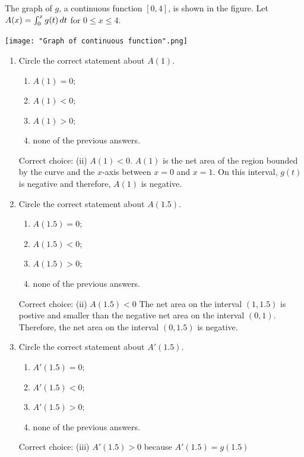 \documentclass[nooutcomes,handout]{ximera}
\begin{document}
\begin{problem}
  The graph of $g$, a continuous function $[0, 4]$, is shown in the figure.
  Let $A(x) = \int_0^x g(t) \,d t$ for $0 \le x \le 4$.
  \begin{image}
    \texttt{[image: "Graph of continuous function".png]}
  \end{image}
  \begin{enumerate}
  
    \item
      Circle the correct statement about $A(1)$.
      \begin{enumerate}
        \item $A(1) = 0$;
        \item $A(1) < 0$;
        \item $A(1) > 0$;
        \item none of the previous answers.
      \end{enumerate}
      \begin{freeResponse}
        Correct choice: (ii) $A(1) < 0$.  $A(1)$ is the net area of the region bounded by the curve and the $x$-axis between $x=0$ and $x=1$.  On this interval, $g(t)$ is negative and therefore, $ A(1)$ is negative.
      \end{freeResponse}

    \item
      Circle the correct statement about $A(1.5)$.
      \begin{enumerate}
        \item $A(1.5) = 0$;
        \item $A(1.5) < 0$;
        \item $A(1.5) > 0$;
        \item  none of the previous answers.
      \end{enumerate}
      \begin{freeResponse}
        Correct choice: (ii) $A(1.5) < 0$  The net area on the interval $(1,1.5)$ is postive and smaller than the negative net area on the interval $(0,1)$.  Therefore, the net area on the interval $(0,1.5)$ is negative.
      \end{freeResponse}

    \item
      Circle the correct statement about $A'(1.5)$.
      \begin{enumerate}
        \item $A'(1.5) = 0$;
        \item $A'(1.5) < 0$;
        \item $A'(1.5) > 0$;
        \item none of the previous answers.
      \end{enumerate}
      \begin{freeResponse}
        Correct choice: (iii) $A'(1.5) > 0$  because $A'(1.5)=g(1.5)$
      \end{freeResponse}


\end{enumerate}
\end{problem}
\end{document}
